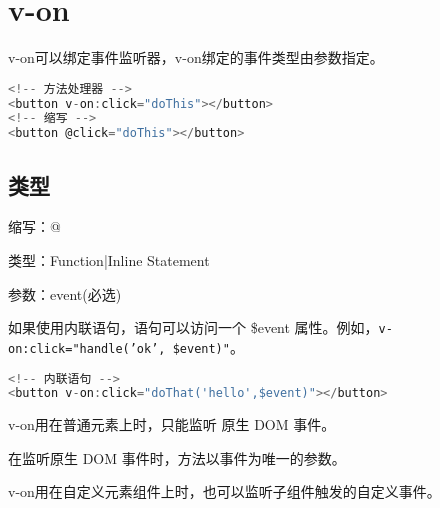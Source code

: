 \begin{lstlisting}[language=JavaScript]

\end{lstlisting}




\begin{lstlisting}[language=JavaScript]

\end{lstlisting}




\begin{lstlisting}[language=JavaScript]

\end{lstlisting}




\begin{lstlisting}[language=JavaScript]

\end{lstlisting}

\chapter{v-on}

v-on可以绑定事件监听器，v-on绑定的事件类型由参数指定。


\begin{lstlisting}[language=JavaScript]
<!-- 方法处理器 -->
<button v-on:click="doThis"></button>
<!-- 缩写 -->
<button @click="doThis"></button>
\end{lstlisting}

\section{类型}

\begin{compactitem}
\item 缩写：@
\item 类型：Function|Inline Statement
\item 参数：event(必选)
\end{compactitem}


如果使用内联语句，语句可以访问一个 \$event 属性。例如，\texttt{v-on:click="handle('ok', \$event)"}。

\begin{lstlisting}[language=JavaScript]
<!-- 内联语句 -->
<button v-on:click="doThat('hello',$event)"></button>
\end{lstlisting}

\begin{compactitem}
\item v-on用在普通元素上时，只能监听 原生 DOM 事件。

在监听原生 DOM 事件时，方法以事件为唯一的参数。

\item v-on用在自定义元素组件上时，也可以监听子组件触发的自定义事件。
\end{compactitem}

